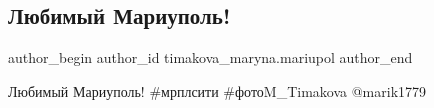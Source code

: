  
 
 
 
 

\subsection{Любимый Мариуполь!}
\label{sec:28_03_2019.fb.timakova_maryna.mariupol.1.lodka}

\ifcmt
 author_begin
   author_id timakova_maryna.mariupol
 author_end
\fi

Любимый Мариуполь! \#мрплсити \#фотоM\_Timakova @marik1779
